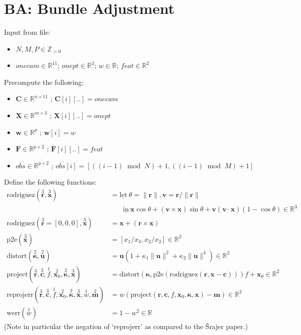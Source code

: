 \documentclass[11pt]{article}
\newcommand\R{\mathbb R}
\newcommand\Z{\mathbb Z}
\renewcommand\mod{\;\mathop{\mathrm{mod}}\;}
\begin{document}
\newpage

\section{BA: Bundle Adjustment}

Input from file:
\begin{itemize}
\item $N, M, P \in \Z_{>0}$
\item $\mathit{onecam} \in \R^{11}$;
	$\mathit{onept} \in \R^3$;
	$w \in \R$;
	$\mathit{feat} \in \R^2$
\end{itemize}

Precompute the following:
\begin{itemize}
\item $\bm{C} \in \R^{n \times 11}$ ;
		$\bm{C}[i][..] = \mathit{onecam}$
\item $\bm{X} \in \R^{m \times 3}$ ;
		$\bm{X}[i][..] = \mathit{onept}$
\item $\bm{w} \in \R^p$ ;
		$\bm{w}[i] = w$
\item $\bm{F} \in \R^{p \times 2}$ ;
		$\bm{F}[i][..] = \mathit{feat}$
\item $\mathit{obs} \in \R^{p \times 2}$ ;
		$\mathit{obs}[i] = [((i - 1) \mod N) + 1, ((i - 1) \mod M) + 1]$
\end{itemize}

Define the following functions:
\begin{align*}
\mathrm{rodriguez}(\overset3{\bm{r}}, \overset3{\bm{x}}) &=
	\mathrm{\underline{let}}\ \theta = \lVert \bm{r} \rVert,
					\bm{v} = \bm{r} / \lVert \bm{r} \rVert \\
	&\phantom{=}\;\ \mathrm{\underline{in}}\ \bm{x} \cos \theta + (\bm{v} \times \bm{x}) \sin \theta + \bm{v} (\bm{v} \cdot \bm{x}) (1 - \cos \theta) \in \R^3 \\
\mathrm{rodriguez}(\overset3{\bm{r}}=[0,0,0], \overset3{\bm{x}}) &=
	\bm{x} + (\bm{r} \times \bm{x}) \\
\mathrm{p2e}(\overset3{\bm{x}}) &=
	[x_1 / x_3, x_2 / x_3] \in \R^2 \\
\mathrm{distort}(\overset2{\bm{\kappa}}, \overset2{\bm{u}}) &=
	\bm{u}(1 + \kappa_1 \lVert \bm{u} \rVert^2 + \kappa_2 \lVert \bm{u} \rVert^4) \in \R^2 \\
\mathrm{project}(\overset3{\bm{r}}, \overset3{\bm{c}}, \overset1f, \overset2{\bm{x}_0}, \overset2{\bm{\kappa}}, \overset3{\bm{x}}) &=
	\mathrm{distort}(\bm{\kappa}, \mathrm{p2e}(\mathrm{rodriguez}(\bm{r}, \bm{x} - \bm{c}))) f + \bm{x}_0 \in \R^2 \\
\mathrm{reprojerr}(\overset3{\bm{r}}, \overset3{\bm{c}}, \overset1f, \overset2{\bm{x}_0}, \overset2{\bm{\kappa}}, \overset3{\bm{x}}, \overset1w, \overset2{\bm{m}}) &=
	w(\mathrm{project}(\bm{r}, \bm{c}, f, \bm{x}_0, \bm{\kappa}, \bm{x}) - \bm{m}) \in \R^2 \\
\mathrm{werr}(\overset1w) &=
	1 - w^2 \in \R
\end{align*}
(Note in particular the negation of `reprojerr' as compared to the \v{S}rajer paper.)
\end{document}
